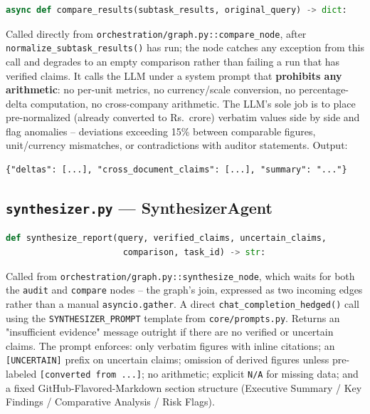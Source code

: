 \documentclass[11pt,a4paper]{report}
\newcommand{\code}[1]{\texttt{#1}}
\newcommand{\file}[1]{\texttt{\small #1}}
\begin{document}
\begin{lstlisting}[language=Python]
async def compare_results(subtask_results, original_query) -> dict:
\end{lstlisting}

Called directly from \code{orchestration/graph.py}\code{::compare\_node}, after
\code{normalize\_subtask\_results()} has run; the node catches any exception from this
call and degrades to an empty comparison rather than failing a run that has verified
claims. It calls the LLM under a system prompt that
\textbf{prohibits any arithmetic}: no per-unit metrics, no currency/scale conversion, no
percentage-delta computation, no cross-company arithmetic. The LLM's sole job is to
place pre-normalized (already converted to Rs.\ crore) verbatim
values side by side and flag anomalies -- deviations exceeding 15\% between comparable
figures, unit/currency mismatches, or contradictions with auditor statements. Output:
\begin{lstlisting}[language=jsonlang]
{"deltas": [...], "cross_document_claims": [...], "summary": "..."}
\end{lstlisting}

\subsection{\file{synthesizer.py} --- SynthesizerAgent}

\begin{lstlisting}[language=Python]
def synthesize_report(query, verified_claims, uncertain_claims,
                       comparison, task_id) -> str:
\end{lstlisting}

Called from \code{orchestration/graph.py}\code{::synthesize\_node}, which waits for
both the \code{audit} and \code{compare} nodes -- the graph's join, expressed as two
incoming edges rather than a manual \code{asyncio.gather}. A direct
\code{chat\_completion\_hedged()} call using the \code{SYNTHESIZER\_PROMPT} template
from \file{core/prompts.py}. Returns an
"insufficient evidence" message outright if there are no verified or uncertain claims.
The prompt enforces: only verbatim figures with inline citations; an
\code{[UNCERTAIN]} prefix on uncertain claims; omission of derived figures unless
pre-labeled \code{[converted from ...]}; no arithmetic; explicit \code{N/A} for missing
data; and a fixed GitHub-Flavored-Markdown section structure (Executive Summary / Key
Findings / Comparative Analysis / Risk Flags).
\end{document}
